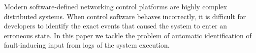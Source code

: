 Modern software-defined networking control platforms are highly complex distributed
systems. When control software behaves incorrectly, it is difficult 
for developers to identify the exact events that caused the system to enter
an erroneous state. In this paper we tackle the problem of automatic
identification of fault-inducing input from logs of the system execution.

%
%
%
%
%
%


